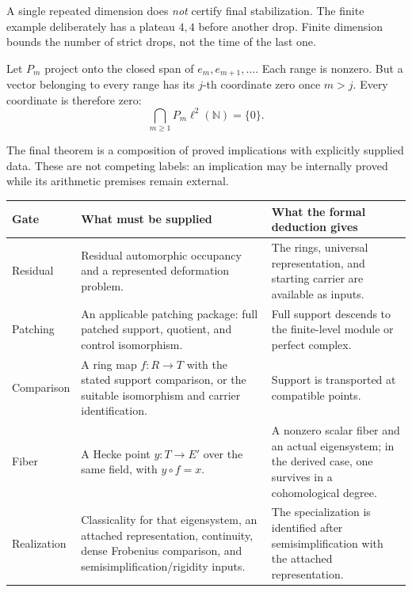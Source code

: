 \begin{insight}
A single repeated dimension does \emph{not} certify final stabilization. The finite example deliberately has a plateau $4,4$ before another drop. Finite dimension bounds the number of strict drops, not the time of the last one.
\end{insight}

Let $P_m$ project onto the closed span of $e_m,e_{m+1},\ldots$. Each range is nonzero. But a vector belonging to every range has its $j$-th coordinate zero once $m>j$. Every coordinate is therefore zero:
\[
\bigcap_{m\ge1}P_m\ell^2(\mathbb N)=\{0\}.
\]


The final theorem is a composition of proved implications with explicitly supplied data. These are not competing labels: an implication may be internally proved while its arithmetic premises remain external.

{\small
\begin{tabularx}{\linewidth}{@{}p{.13\linewidth}YY@{}}\toprule
\textbf{Gate} & \textbf{What must be supplied} & \textbf{What the formal deduction gives}\\\midrule
Residual & Residual automorphic occupancy and a represented deformation problem. & The rings, universal representation, and starting carrier are available as inputs.\\
Patching & An applicable patching package: full patched support, quotient, and control isomorphism. & Full support descends to the finite-level module or perfect complex.\\
Comparison & A ring map $f:R\to T$ with the stated support comparison, or the suitable isomorphism and carrier identification. & Support is transported at compatible points.\\
Fiber & A Hecke point $y:T\to E'$ over the same field, with $y\circ f=x$. & A nonzero scalar fiber and an actual eigensystem; in the derived case, one survives in a cohomological degree.\\
Realization & Classicality for that eigensystem, an attached representation, continuity, dense Frobenius comparison, and semisimplification/rigidity inputs. & The specialization is identified after semisimplification with the attached representation.\\\bottomrule
\end{tabularx}}

